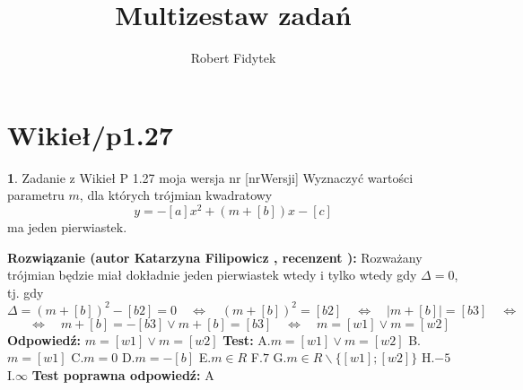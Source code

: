 \documentclass[12pt, a4paper]{article}
\title{Multizestaw zadań}
\author{Robert Fidytek}
\date{}
\theoremstyle{definition} %
\newtheorem{zad}{}
\newcommand{\kategoria}[1]{\section{#1}} %
\newcommand{\zadStart}[1]{\begin{zad}#1\newline} %
\newcommand{\zadStop}{\end{zad}}   %
\newcommand{\rozwStart}[2]{\noindent \textbf{Rozwiązanie (autor #1 , recenzent #2): }\newline} %
\newcommand{\rozwStop}{\newline}                                            %
\newcommand{\odpStart}{\noindent \textbf{Odpowiedź:}\newline}    %
\newcommand{\odpStop}{\newline}                                             %
\newcommand{\testStart}{\noindent \textbf{Test:}\newline} %
\newcommand{\testStop}{\newline} %
\newcommand{\kluczStart}{\noindent \textbf{Test poprawna odpowiedź:}\newline} %
\newcommand{\kluczStop}{\newline} %
\begin{document}
\maketitle


\kategoria{Wikieł/p1.27}
\zadStart{Zadanie z Wikieł P 1.27 moja wersja nr [nrWersji]}
Wyznaczyć wartości parametru $m$, dla których trójmian kwadratowy
$$
y=-[a]x^2+(m+[b])x-[c]
$$
ma jeden pierwiastek.
\zadStop
\rozwStart{Katarzyna Filipowicz}{}
Rozważany trójmian będzie miał dokładnie jeden pierwiastek wtedy i tylko wtedy gdy $\Delta=0$, tj. gdy
$$
\Delta=(m+[b])^2-[b2]=0 \quad \Leftrightarrow \quad (m+[b])^2=[b2] \quad \Leftrightarrow \quad |m+[b]|=[b3] 
\quad \Leftrightarrow \quad
$$ $$
\quad \Leftrightarrow \quad m+[b]=-[b3] \lor  m+[b]=[b3] \quad \Leftrightarrow \quad m=[w1] \lor m=[w2]
$$
\rozwStop
\odpStart
$ m=[w1] \lor m=[w2]$
\odpStop
\testStart
A.$ m=[w1] \lor m=[w2]$
B.$m=[w1]$
C.$m=0$
D.$m=-[b]$
E.$m \in R$
F.$7$
G.$m \in R \backslash \{[w1];[w2]\}$
H.$-5$
I.$\infty$
\testStop
\kluczStart
A
\kluczStop
\end{document}
